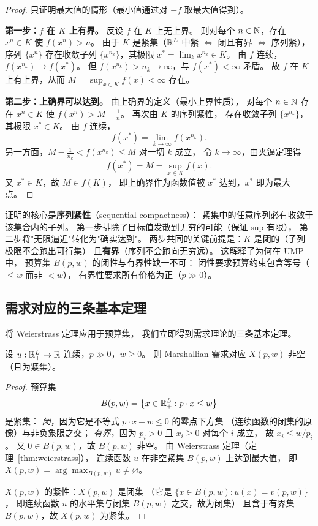 \begin{proof}
只证明最大值的情形（最小值通过对 $-f$ 取最大值得到）。

\textbf{第一步：$f$ 在 $K$ 上有界。}
反设 $f$ 在 $K$ 上无上界。
则对每个 $n\in\mathbb{N}$，存在 $x^n\in K$ 使 $f(x^n)>n$。
由于 $K$ 是紧集（$\mathbb{R}^L$ 中紧 $\Leftrightarrow$ 闭且有界 $\Leftrightarrow$ 序列紧），
序列 $\{x^n\}$ 存在收敛子列 $\{x^{n_k}\}$，其极限 $x^*=\lim_k x^{n_k}\in K$。
由 $f$ 连续，$f(x^{n_k})\to f(x^*)$。
但 $f(x^{n_k})>n_k\to\infty$，与 $f(x^*)<\infty$ 矛盾。
故 $f$ 在 $K$ 上有上界，从而 $M=\sup_{x\in K}f(x)<\infty$ 存在。

\textbf{第二步：上确界可以达到。}
由上确界的定义（最小上界性质），
对每个 $n\in\mathbb{N}$ 存在 $x^n\in K$ 使 $f(x^n)>M-\frac{1}{n}$。
再次由 $K$ 的序列紧性，
存在收敛子列 $\{x^{n_k}\}$，其极限 $x^*\in K$。
由 $f$ 连续，
\[
  f(x^*)=\lim_{k\to\infty}f(x^{n_k}).
\]
另一方面，$M-\frac{1}{n_k}<f(x^{n_k})\le M$ 对一切 $k$ 成立，
令 $k\to\infty$，由夹逼定理得
\[
  f(x^*)=M=\sup_{x\in K}f(x).
\]
又 $x^*\in K$，故 $M\in f(K)$，
即上确界作为函数值被 $x^*$ 达到，$x^*$ 即为最大点。
\end{proof}

\begin{remark}[证明结构解读]
证明的核心是\textbf{序列紧性}（sequential compactness）：
紧集中的任意序列必有收敛于该集合内的子列。
第一步排除了目标值发散到无穷的可能（保证 sup 有限），
第二步将"无限逼近"转化为"确实达到"。
两步共同的关键前提是：$K$ 是\textbf{闭}的（子列极限不会跑出可行集）
且\textbf{有界}（序列不会跑向无穷远）。
这解释了为何在 UMP 中，
预算集 $B(p,w)$ 的闭性与有界性缺一不可：
闭性要求预算约束包含等号（$\le w$ 而非 $<w$），
有界性要求所有价格为正（$p\gg 0$）。
\end{remark}

\subsection{需求对应的三条基本定理}
\label{subsec:demand-three-theorems}

将 Weierstrass 定理应用于预算集，
我们立即得到需求理论的三条基本定理。

\begin{theorem}[需求对应非空]\label{thm:demand-nonempty}
设 $u:\mathbb{R}^L_+\to\mathbb{R}$ 连续，$p\gg 0$，$w\ge 0$。
则 Marshallian 需求对应 $X(p,w)$ 非空（且为紧集）。
\end{theorem}

\begin{proof}
预算集
\[
  B(p,w)=\bigl\{x\in\mathbb{R}^L_+:p\cdot x\le w\bigr\}
\]
是紧集：
\emph{闭}，因为它是不等式 $p\cdot x-w\le 0$ 的零点下方集
（连续函数的闭集的原像）与非负象限之交；
\emph{有界}，因为 $p_i>0$ 且 $x_i\ge 0$ 对每个 $i$ 成立，
故 $x_i\le w/p_i$。
又 $0\in B(p,w)$，故 $B(p,w)$ 非空。
由 Weierstrass 定理（定理~\ref{thm:weierstrass}），
连续函数 $u$ 在非空紧集 $B(p,w)$ 上达到最大值，
即 $X(p,w)=\arg\max_{B(p,w)}u\neq\varnothing$。

$X(p,w)$ 的紧性：$X(p,w)$ 是闭集
（它是 $\{x\in B(p,w):u(x)=v(p,w)\}$，
即连续函数 $u$ 的水平集与闭集 $B(p,w)$ 之交，故为闭集）
且含于有界集 $B(p,w)$，故 $X(p,w)$ 为紧集。
\end{proof}

